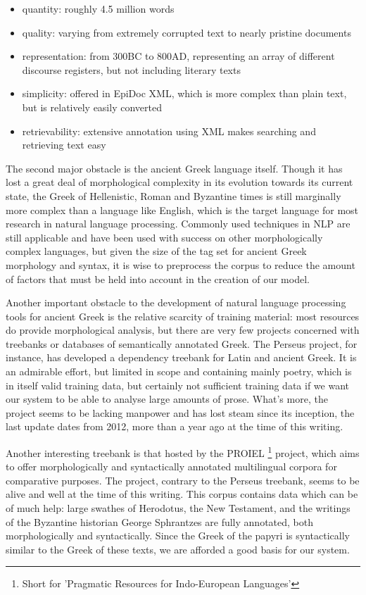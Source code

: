 \begin{itemize}
\item quantity: roughly 4.5 million words
\item quality: varying from extremely corrupted text to nearly pristine documents
\item representation: from 300BC to 800AD, representing an array of different discourse registers, but not including literary texts
\item simplicity: offered in EpiDoc XML, which is more complex than
plain text, but is relatively easily converted
\item retrievability: extensive annotation using XML makes searching and retrieving text easy
\end{itemize}

The second major obstacle is the ancient Greek language itself. Though
it has lost a great deal of morphological complexity in its evolution
towards its current state, the Greek of Hellenistic, Roman and
Byzantine times is still marginally more complex than a language like
English, which is the target language for most research in natural
language processing. Commonly used techniques in NLP are still
applicable and have been used with success on other morphologically
complex languages, but given the size of the tag set for ancient Greek
morphology and syntax, it is wise to preprocess the corpus to reduce
the amount of factors that must be held into account in the creation
of our model.

Another important obstacle to the development of natural language
processing tools for ancient Greek is the relative scarcity of
training material: most resources do provide morphological analysis,
but there are very few projects concerned with treebanks or databases
of semantically annotated Greek. The Perseus project, for instance,
has developed a dependency treebank for Latin and ancient Greek. It is
an admirable effort, but limited in scope and containing mainly
poetry, which is in itself valid training data, but certainly not
sufficient training data if we want our system to be able to analyse
large amounts of prose.  What's more, the project seems to be lacking
manpower and has lost steam since its inception, the last update dates
from 2012, more than a year ago at the time of this writing. 

Another interesting treebank is that hosted by the PROIEL
\footnote{Short for 'Pragmatic Resources for Indo-European Languages'}
project, which aims to offer morphologically and syntactically
annotated multilingual corpora for comparative purposes. The project,
contrary to the Perseus treebank, seems to be alive and well at the
time of this writing. This corpus contains data which can be of much
help: large swathes of Herodotus, the New Testament, and the writings
of the Byzantine historian George Sphrantzes are fully annotated, both
morphologically and syntactically. Since the Greek of the papyri is
syntactically similar to the Greek of these texts, we are afforded a
good basis for our system.

